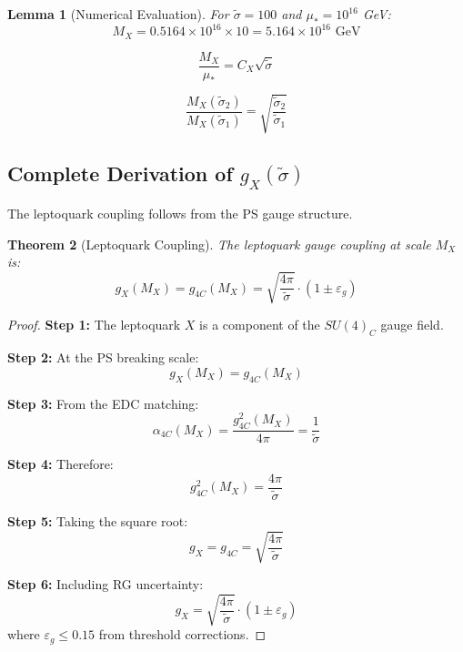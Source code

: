 \documentclass[11pt,letterpaper]{article}
\newtheorem{theorem}{Theorem}[section]
\newtheorem{lemma}[theorem]{Lemma}
\newcommand{\st}{\tilde{\sigma}}
\newcommand{\eps}{\varepsilon}
\begin{document}
\begin{lemma}[Numerical Evaluation]
\label{lem:mx-numerical}
For $\st = 100$ and $\mu_* = 10^{16}$ GeV:
\begin{equation}
M_X = 0.5164 \times 10^{16} \times 10 = 5.164 \times 10^{16} \text{ GeV}
\label{eq:mx-numerical-example}
\end{equation}
\end{lemma}

\begin{equation}
\frac{M_X}{\mu_*} = C_X \sqrt{\st}
\label{eq:mx-ratio}
\end{equation}

\begin{equation}
\frac{M_X(\st_2)}{M_X(\st_1)} = \sqrt{\frac{\st_2}{\st_1}}
\label{eq:mx-ratio-scaling}
\end{equation}

\subsection{Complete Derivation of $g_X(\st)$}
\label{app:gx-derivation}

The leptoquark coupling follows from the PS gauge structure.

\begin{theorem}[Leptoquark Coupling]
\label{thm:gx-derivation}
The leptoquark gauge coupling at scale $M_X$ is:
\begin{equation}
g_X(M_X) = g_{4C}(M_X) = \sqrt{\frac{4\pi}{\st}} \cdot (1 \pm \eps_g)
\label{eq:gx-derivation-main}
\end{equation}
\end{theorem}

\begin{proof}
\textbf{Step 1:} The leptoquark $X$ is a component of the $SU(4)_C$ gauge field.

\textbf{Step 2:} At the PS breaking scale:
\begin{equation}
g_X(M_X) = g_{4C}(M_X)
\label{eq:gx-equals-g4c}
\end{equation}

\textbf{Step 3:} From the EDC matching:
\begin{equation}
\alpha_{4C}(M_X) = \frac{g_{4C}^2(M_X)}{4\pi} = \frac{1}{\st}
\label{eq:alpha4c-matching}
\end{equation}

\textbf{Step 4:} Therefore:
\begin{equation}
g_{4C}^2(M_X) = \frac{4\pi}{\st}
\label{eq:g4c-squared}
\end{equation}

\textbf{Step 5:} Taking the square root:
\begin{equation}
g_X = g_{4C} = \sqrt{\frac{4\pi}{\st}}
\label{eq:gx-result}
\end{equation}

\textbf{Step 6:} Including RG uncertainty:
\begin{equation}
g_X = \sqrt{\frac{4\pi}{\st}} \cdot (1 \pm \eps_g)
\label{eq:gx-with-envelope}
\end{equation}
where $\eps_g \leq 0.15$ from threshold corrections.
\end{proof}
\end{document}
